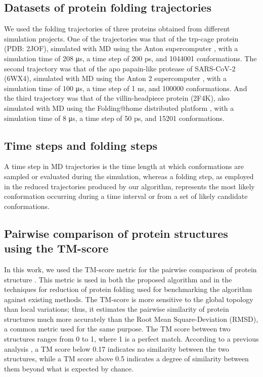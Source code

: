 \documentclass[twocolumn]{bmcart}%
\newcommand{\ns}{\si{\nano\second}}
\newcommand{\ps}{\si{\pico\second}}
\newcommand{\us}{\si{\micro\second}}
\begin{document}
\subsection*{Datasets of protein folding trajectories}

We used the folding trajectories of three proteins obtained from different simulation projects. One of the trajectories was that of the trp-cage protein (PDB: 2JOF), simulated with MD using the Anton supercomputer \cite{Shaw2011}, with a simulation time of 208 \us, a time step of 200 \ps, and 1044001 conformations. The second trajectory was that of the apo papain-like protease of SARS-CoV-2 (6WX4), simulated with MD using the Anton 2 supercomputer \cite{Shaw2020}, with a simulation time of 100 \us, a time step of 1 \ns, and 100000 conformations. And the third trajectory was that of the villin-headpiece protein (2F4K), also simulated with MD using the Folding@home distributed platform \cite{PandeEnsign07}, with a simulation time of 8 \us, a time step of 50 \ps, and 15201 conformations.

\subsection*{Time steps and folding steps}

A time step in MD trajectories is the time length at which conformations are sampled or evaluated during the simulation, whereas a folding step, as employed in the reduced trajectories produced by our algorithm, represents the most likely conformation occurring during a time interval or from a set of likely candidate conformations.

\subsection*{Pairwise comparison of protein structures using the TM-score \label{sec:Comparing-Structures}}

In this work, we used the TM-score metric for the pairwise comparison of protein structure \cite{Zhang2004}. This metric is used in both the proposed algorithm and in the techniques for reduction of protein folding used for benchmarking the algorithm against existing methods. The TM-score is more sensitive to the global topology than local variations; thus, it estimates the pairwise similarity of protein structures much more accurately than the Root Mean Square-Deviation (RMSD), a common metric used for the same purpose. The TM score between two structures ranges from 0 to 1, where 1 is a perfect match. According to a previous analysis \cite{zhang2010}, a TM score below 0.17 indicates no similarity between the two structures, while a TM score above 0.5 indicates a degree of similarity between them beyond what is expected by chance.
\end{document}
